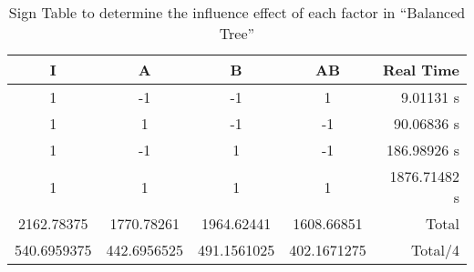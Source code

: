 \begin{table}[h]
	\caption{Sign Table to determine the influence effect of each factor in ``Balanced Tree''}
	\center
	\begin{tabular}{ c c c c r }
		\hline
		I & A & B & AB & Real Time \\
		\hline
		1 & -1 & -1 &  1 &    9.01131 s \\
		1 &  1 & -1 & -1 &   90.06836 s \\
		1 & -1 &  1 & -1 &  186.98926 s \\
		1 &  1 &  1 &  1 & 1876.71482 s \\
		\hline
		2162.78375 & 1770.78261 & 1964.62441 & 1608.66851 & Total \\
		540.6959375 & 442.6956525 & 491.1561025 & 402.1671275 & Total/4 \\
		\hline
	\end{tabular}
\end{table}